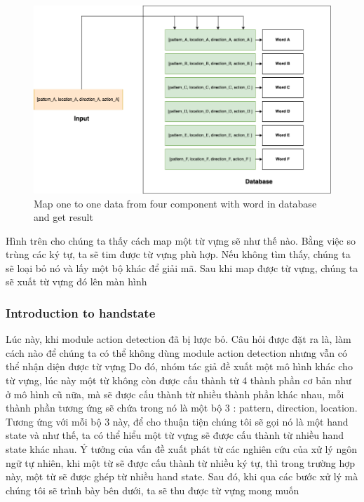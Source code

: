     \begin{figure}[H]
      \centering
      \includegraphics[width=\textwidth]{img/Chap4/MapWord.png}
      \caption{Map one to one data from four component with word in database and get result}
      \label{fig:Chap4-MapWord}
    \end{figure}

    Hình trên cho chúng ta thấy cách map một từ vựng sẽ như thế nào.
    Bằng việc so trùng các ký tự, ta sẽ tim được từ vựng phù hợp.
    Nếu không tìm thấy, chúng ta sẽ loại bỏ nó và lấy một bộ khác
    để giải mã.
    Sau khi map được từ vựng, chúng ta sẽ xuất từ vựng đó lên màn hình
    \subsubsection{ Introduction to handstate }
      Lúc này, khi module action detection đã bị lược bỏ. Câu hỏi được đặt ra là,
      làm cách nào để chúng ta có thể không dùng module action detection nhưng vẫn có thể
      nhận diện được từ vựng
      Do đó, nhóm tác giả đề xuất một mô hình khác cho từ vựng, lúc này
      một từ không còn được cấu thành từ 4 thành phần cơ bản như ở mô hình cũ nữa,
      mà sẽ được cấu thành từ nhiều thành phần khác nhau, mỗi thành phần tương ứng
      sẽ chứa trong nó là một bộ 3 : pattern, direction, location. Tương ứng với mỗi
      bộ 3 này, để cho thuận tiện chúng tôi sẽ gọi nó là một hand state và như thế, ta có thể hiểu một từ vựng
      sẽ được cấu thành từ nhiều hand state khác nhau. Ý tưởng của vấn đề xuất phát
      từ các nghiên cứu của xử lý ngôn ngữ tự nhiên, khi một từ sẽ được cấu thành từ
      nhiều ký tự, thì trong trường hợp này, một từ sẽ được ghép từ nhiều hand state.
      Sau đó, khi qua các bước xử lý mà chúng tôi sẽ trình bày bên dưới, ta sẽ thu được từ vựng mong muốn
      
